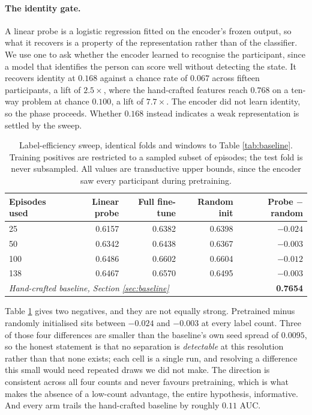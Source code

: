 \documentclass{article}
\begin{document}
\paragraph{The identity gate.} A linear probe is a logistic regression
fitted on the encoder's frozen output, so what it recovers is a property of the
representation rather than of the classifier. We use one to ask whether the
encoder learned to recognise the participant, since a model that identifies the
person can score well without detecting the state. It recovers identity at $0.168$ against a chance rate of
$0.067$ across fifteen participants, a lift of $2.5\times$, where the
hand-crafted features reach $0.768$ on a ten-way problem at chance $0.100$, a
lift of $7.7\times$. The encoder did not learn
identity, so the phase proceeds. Whether $0.168$ instead indicates a weak representation is
settled by the sweep.

\begin{table}[t]
\caption{Label-efficiency sweep, identical folds and windows to Table
\ref{tab:baseline}. Training positives are restricted to a sampled subset of
episodes; the test fold is never subsampled. All values are transductive upper
bounds, since the encoder saw every participant during pretraining.}
\label{tab:ssl}
\centering
\begin{tabular}{lrrrr}
\toprule
Episodes used & Linear probe & Full fine-tune & Random init & Probe $-$ random \\
\midrule
25  & 0.6157 & 0.6382 & 0.6398 & $-0.024$ \\
50  & 0.6342 & 0.6438 & 0.6367 & $-0.003$ \\
100 & 0.6486 & 0.6602 & 0.6604 & $-0.012$ \\
138 & 0.6467 & 0.6570 & 0.6495 & $-0.003$ \\
\midrule
\multicolumn{4}{l}{\emph{Hand-crafted baseline, Section \ref{sec:baseline}}}
  & \textbf{0.7654} \\
\bottomrule
\end{tabular}
\end{table}

Table \ref{tab:ssl} gives two negatives, and they are not equally strong.
Pretrained minus randomly initialised sits between $-0.024$ and $-0.003$ at
every label count. Three of those four differences are smaller than the
baseline's own seed spread of $0.0095$, so the honest statement is that no
separation is \emph{detectable} at this resolution rather than that none
exists; each cell is a single run, and resolving a difference this small would
need repeated draws we did not make. The direction is consistent across all
four counts and never favours pretraining, which is what makes the absence of a
low-count advantage, the entire hypothesis, informative. And every arm trails
the hand-crafted baseline by roughly $0.11$ AUC.
\end{document}
